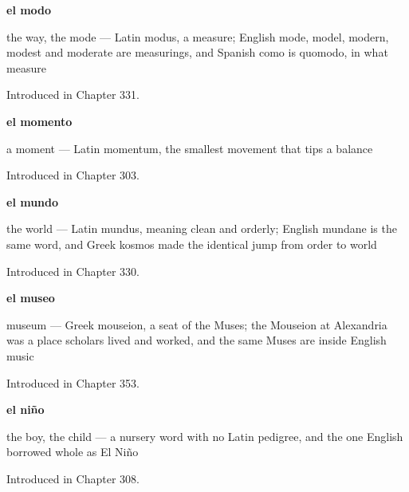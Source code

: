 \noindent\begin{minipage}[t]{\linewidth}
\raggedright
\textbf{el modo}\par
\small the way, the mode — Latin modus, a measure; English mode, model, modern, modest and moderate are measurings, and Spanish como is quomodo, in what measure\par
\footnotesize Introduced in Chapter 331.
\end{minipage}\par\medskip

\noindent\begin{minipage}[t]{\linewidth}
\raggedright
\textbf{el momento}\par
\small a moment — Latin momentum, the smallest movement that tips a balance\par
\footnotesize Introduced in Chapter 303.
\end{minipage}\par\medskip

\noindent\begin{minipage}[t]{\linewidth}
\raggedright
\textbf{el mundo}\par
\small the world — Latin mundus, meaning clean and orderly; English mundane is the same word, and Greek kosmos made the identical jump from order to world\par
\footnotesize Introduced in Chapter 330.
\end{minipage}\par\medskip

\noindent\begin{minipage}[t]{\linewidth}
\raggedright
\textbf{el museo}\par
\small museum — Greek mouseion, a seat of the Muses; the Mouseion at Alexandria was a place scholars lived and worked, and the same Muses are inside English music\par
\footnotesize Introduced in Chapter 353.
\end{minipage}\par\medskip

\noindent\begin{minipage}[t]{\linewidth}
\raggedright
\textbf{el niño}\par
\small the boy, the child --- a nursery word with no Latin pedigree, and the one English borrowed whole as El Niño\par
\footnotesize Introduced in Chapter 308.
\end{minipage}\par\medskip

